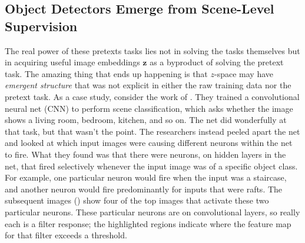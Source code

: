 \subsection{Object Detectors Emerge from Scene-Level Supervision}
The real power of these pretexts tasks lies not in solving the tasks themselves but in acquiring useful image embeddings $\mathbf{z}$ as a byproduct of solving the pretext task. The amazing thing that ends up happening is that $z$-space may have \textit{emergent structure} that was not explicit in either the raw training data nor the pretext task. As a case study, consider the work of \cite{zhou2014object}. They trained a convolutional neural net (CNN) to perform scene classification, which asks whether the image shows a living room, bedroom, kitchen, and so on. The net did wonderfully at that task, but that wasn't the point. The researchers instead peeled apart the net and looked at which input images were causing different neurons within the net to fire. What they found was that there were neurons, on hidden layers in the net, that fired selectively whenever the input image was of a specific object class. For example, one particular neuron would fire when the input was a staircase, and another neuron would fire predominantly for inputs that were rafts. The subsequent images (\fig{\ref{fig:representation_learning:obj_detectors_emerge}}) show four of the top images that activate these two particular neurons. These particular neurons are on convolutional layers, so really each is a filter response; the highlighted regions indicate where the feature map for that filter exceeds a threshold.
